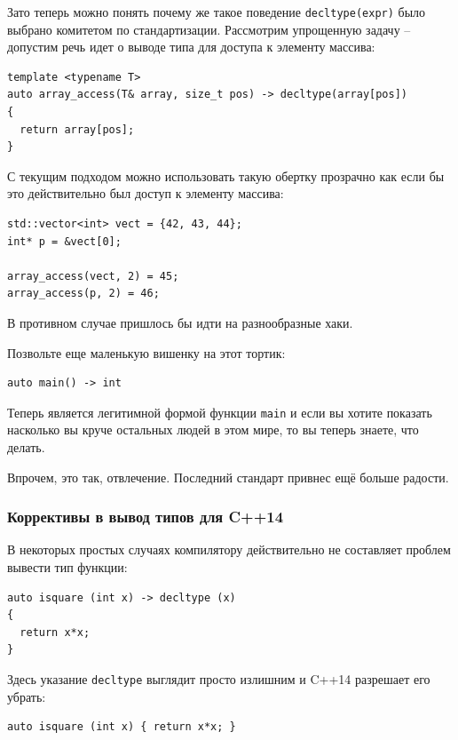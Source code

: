 \documentclass[a4paper,12pt,oneside]{article}
\newif\ifanswers
\begin{document}
\ifanswers
Правильный ответ: ссылка будет если типы одинаковые. Если они разные, все будет хорошо.
\fi

Зато теперь можно понять почему же такое поведение \lstinline!decltype(expr)! было выбрано комитетом по стандартизации. Рассмотрим упрощенную задачу -- допустим речь идет о выводе типа для доступа к элементу массива:

\begin{lstlisting}
template <typename T>
auto array_access(T& array, size_t pos) -> decltype(array[pos]) 
{
  return array[pos];
}
\end{lstlisting}

С текущим подходом можно использовать такую обертку прозрачно как если бы это действительно был доступ к элементу массива:

\begin{lstlisting}
std::vector<int> vect = {42, 43, 44};
int* p = &vect[0];

array_access(vect, 2) = 45;
array_access(p, 2) = 46;
\end{lstlisting}

В противном случае пришлось бы идти на разнообразные хаки.

Позвольте еще маленькую вишенку на этот тортик:

\begin{lstlisting}
auto main() -> int
\end{lstlisting}

Теперь является легитимной формой функции \lstinline!main! и если вы хотите показать насколько вы круче остальных людей в этом мире, то вы теперь знаете, что делать.

Впрочем, это так, отвлечение. Последний стандарт привнес ещё больше радости.

\subsubsection{Коррективы в вывод типов для C++14}\label{DecltypeAuto14}

В некоторых простых случаях компилятору действительно не составляет проблем вывести тип функции: 

\begin{lstlisting}
auto isquare (int x) -> decltype (x) 
{ 
  return x*x;
}
\end{lstlisting}

Здесь указание \lstinline!decltype! выглядит просто излишним и C++14 разрешает его убрать:

\begin{lstlisting}
auto isquare (int x) { return x*x; }
\end{lstlisting}
\end{document}
